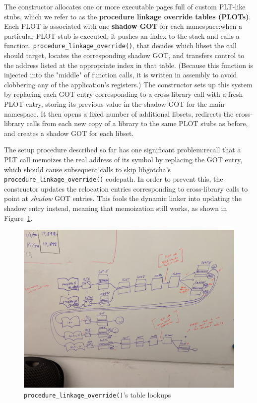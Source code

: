 The constructor allocates one or more executable pages full of custom PLT-like
stubs, which we refer to as the \textbf{procedure linkage override tables (PLOTs)}.
Each PLOT is associated with one \textbf{shadow GOT} for each namespace:\@ when a
particular PLOT stub is executed, it pushes an index to the stack and calls a
function, \texttt{procedure\_linkage\_override()}, that decides which libset the call
should target, locates the corresponding shadow GOT, and transfers control to the
address listed at the appropriate index in that table.  (Because this function
is injected into the "middle" of function calls, it is written in assembly to avoid
clobbering any of the application's registers.)  The constructor sets up this system
by replacing each GOT entry corresponding to a cross-library call with a fresh PLOT
entry, storing its previous value in the shadow GOT for the main namespace.  It then
opens a fixed number of additional libsets, redirects the cross-library calls from
each new copy of a library to the same PLOT stubs as before, and creates a shadow GOT
for each libset.

The setup procedure described so far has one significant problem:\@ recall that a PLT
call memoizes the real address of its symbol by replacing the GOT entry, which should
cause subsequent calls to skip libgotcha's \texttt{procedure\_linkage\_override()}
codepath.  In order to prevent this, the constructor updates the relocation entries
corresponding to cross-library calls to point at \textit{shadow} GOT entries.  This
fools the dynamic linker into updating the shadow entry instead, meaning that
memoization still works, as shown in Figure~\ref{fig:override}.

\begin{figure}
\includegraphics[width=\columnwidth]{figs/tables}
\caption{\texttt{procedure\_linkage\_override()}'s table lookups}
\label{fig:override}
\end{figure}

